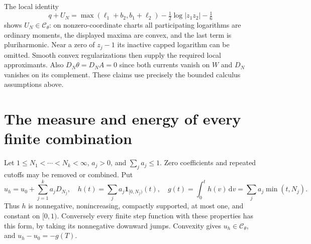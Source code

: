 \documentclass[11pt]{article}
\newcommand{\C}{\mathcal C_\theta}
\begin{document}
The local identity
\[
 q+U_N=\max(\ell_1+b_2,b_1+\ell_2)
                    -\tfrac12\log|z_1z_2|-\tfrac16
\]
shows $U_N\in\C$: on nonzero-coordinate charts all participating logarithms
are ordinary moments, the displayed maxima are convex, and the last term
is pluriharmonic. Near a zero of $z_j-1$ its inactive capped logarithm can
be omitted. Smooth convex regularizations then supply the required local
approximants. Also $D_N\theta=D_N A=0$ since both currents vanish on $W$
and $D_N$ vanishes on its complement. These claims use precisely the
bounded calculus assumptions above.

\section{The measure and energy of every finite combination}
Let $1\leq N_1<\cdots<N_k<\infty$, $a_j>0$, and
$\sum_j a_j\leq1$. Zero coefficients and repeated cutoffs may be removed
or combined. Put
\[
 u_h=u_0+\sum_{j=1}^k a_jD_{N_j},\quad
 h(t)=\sum_j a_j\mathbf1_{[0,N_j)}(t),\quad
 g(t)=\int_0^t h(v)\,\mathrm dv=\sum_j a_j\min(t,N_j).
\]
Thus $h$ is nonnegative, nonincreasing, compactly supported, at most one,
and constant on $[0,1)$. Conversely every finite step function with these
properties has this form, by taking its nonnegative downward jumps.
Convexity gives $u_h\in\C$, and $u_h-u_0=-g(T)$.
\end{document}

